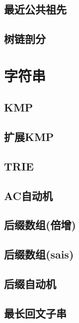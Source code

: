 \section{最近公共祖先}
\raggedbottom
\hrulefill
\section{树链剖分}
\raggedbottom
\hrulefill

\chapter{字符串}
\section{KMP}
\raggedbottom
\hrulefill
\section{扩展KMP}
\raggedbottom
\hrulefill
\section{TRIE}
\raggedbottom
\hrulefill
\section{AC自动机}
\raggedbottom
\hrulefill
\section{后缀数组(倍增)}
\raggedbottom
\hrulefill
\section{后缀数组(sais)}
\raggedbottom
\hrulefill
\section{后缀自动机}
\raggedbottom
\hrulefill
\section{最长回文子串}
\raggedbottom
\hrulefill
